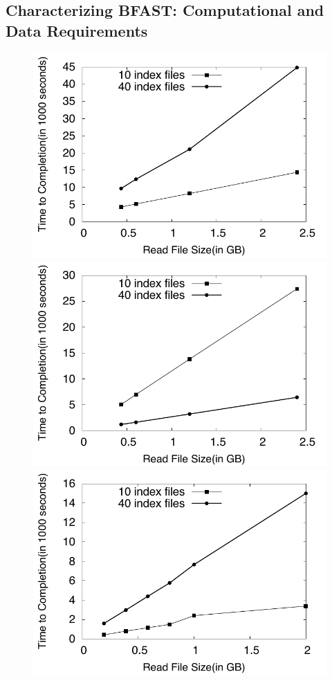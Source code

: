 \documentclass{sig-alternate}
\begin{document}
\subsection{Characterizing BFAST: Computational and Data Requirements}


\begin{figure}
 \centering
\includegraphics[scale=0.66]{figures/readsvstime_hg18.pdf}
\includegraphics[scale=0.66]{figures/readsvstime_hg18_chr21.pdf}
\includegraphics[scale=0.66]{figures/readsvstime_bglumae.pdf}



\end{figure}
\end{document}
